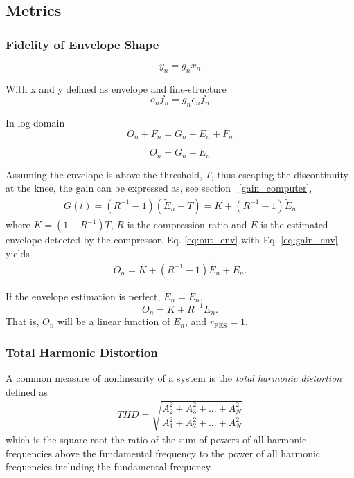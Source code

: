 \documentclass[../main2.tex]{subfiles}
\begin{document}
\subsection{Metrics}
\subsubsection{Fidelity of Envelope Shape} \label{fes}


\begin{equation}
y_n = g_n x_n
\end{equation}

With x and y defined as envelope and fine-structure
\begin{equation}
o_n f_n = g_n e_n f_n
\end{equation}

In log domain
\begin{equation}
O_n + F_n = G_n + E_n + F_n
\end{equation}

 \begin{equation}\label{eq:out_env}
O_n = G_n + E_n
\end{equation}

Assuming the envelope is above the threshold, $T$, thus escaping the discontinuity at the knee, the gain can be expressed as, see section ~\ref{gain_computer},
\begin{align}
G(t) = (R^{-1}-1)(\tilde{E}_n-T) = K + (R^{-1}-1)\tilde{E}_n
\label{eq:gain_env}
\end{align}
where $K = (1-R^{-1})T$, $R$ is the compression ratio and $\tilde{E}$ is the estimated envelope detected by the compressor. Eq. \eqref{eq:out_env} with Eq. \eqref{eq:gain_env} yields
\begin{align}
O_n = K + (R^{-1}-1)\tilde{E}_n + E_n.
\end{align}

If the envelope estimation is perfect, $\tilde{E}_n = E_n$,
\begin{equation}
O_n = K + R^{-1} E_n.
\end{equation}
That is, $O_n$ will be a linear function of $E_n$, and $r_\text{FES} = 1$.


\subsubsection{Total Harmonic Distortion}
A common measure of nonlinearity of a system is the \emph{total harmonic distortion} defined as \cite{dafx02}
\begin{align}
THD = \sqrt{\dfrac{A_2^2 + A_3^2 + ... + A_N^2}{A_1^2 + A_2^2 + ... + A_N^2}}
\end{align}
which is the square root the ratio of the sum of powers of all harmonic frequencies above the fundamental frequency to the power of all harmonic frequencies including the fundamental frequency.
\end{document}
